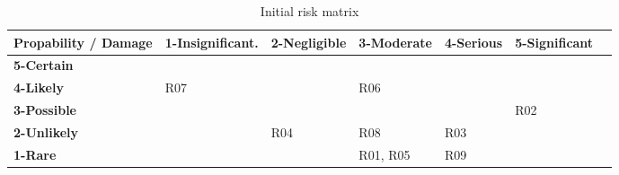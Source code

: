 \begin{table}[H]
  \centering
  \scriptsize
  \begin{tabular}{|m{27mm}|m{24mm}|m{20mm}|m{20mm}|m{20mm}|m{20mm}|@{}m{0pt}@{}}
    \hline
    \bf Propability / Damage
  & \bf 1-Insignificant.
  & \bf 2-Negligible
  & \bf 3-Moderate
  & \bf 4-Serious
  & \bf 5-Significant
  & \\ [10pt]
    \hline
    \bf 5-Certain 
  & \cellcolor{yellow!50}
  & \cellcolor{yellow!50}
  & \cellcolor{orange!50}
  & \cellcolor{red!50}
  & \cellcolor{red!50}
  & \\ [10pt]
    \bf 4-Likely
  & \cellcolor{green!50} R07
  & \cellcolor{yellow!50}
  & \cellcolor{yellow!50} R06
  & \cellcolor{orange!50}
  & \cellcolor{red!50}
  & \\ [10pt]
    \bf 3-Possible
  & \cellcolor{green!50}
  & \cellcolor{green!50}
  & \cellcolor{yellow!50}
  & \cellcolor{yellow!50}
  & \cellcolor{orange!50} R02
  & \\ [10pt]
    \bf 2-Unlikely
  & \cellcolor{green!50}
  & \cellcolor{green!50} R04
  & \cellcolor{green!50} R08
  & \cellcolor{yellow!50} R03
  & \cellcolor{yellow!50}
  & \\ [10pt]
    \bf 1-Rare
  & \cellcolor{green!50}
  & \cellcolor{green!50}
  & \cellcolor{green!50} R01, R05
  & \cellcolor{green!50} R09
  & \cellcolor{green!50}
  & \\ [10pt]
    \hline
  \end{tabular} \\
  \caption{Initial risk matrix}
\end{table}


